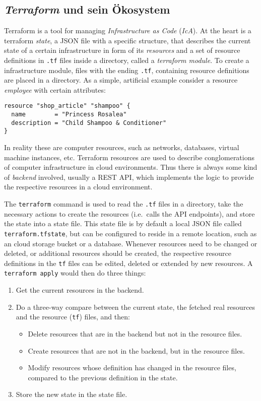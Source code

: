 \documentclass[paper=a4,11pt,numbers=noenddot]{article}
\begin{document}
\subsection{\emph{Terraform} und sein Ökosystem}
\label{subsec:terr-tool-ecosyst}

Terraform is a tool for managing \emph{Infrastructure as Code} (\emph{IcA}). At the heart is a terraform \emph{state}, a JSON file with a specific structure, that describes the current state of a certain infrastructure in form of its \emph{resources} and a set of resource definitions in \verb'.tf' files inside a directory, called a \emph{terraform module}. To create a infrastructure module, files with the ending \verb'.tf', containing resource definitions are placed in a directory. As a simple, artificial example consider a resource \emph{employee} with certain attributes:

\begin{lstlisting}
resource "shop_article" "shampoo" {
  name        = "Princess Rosalea"
  description = "Child Shampoo & Conditioner"
}
\end{lstlisting}

In reality these are computer resources, such as networks, databases, virtual machine instances, etc. Terraform resources are used to describe conglomerations of computer infrastructure in cloud environments. Thus there is always some kind of \emph{backend} involved, usually a REST API, which implements the logic to provide the respective resources in a cloud environment.

The \verb'terraform' command is used to read the \verb'.tf' files in a directory, take the necessary actions to create the resources (i.e.\ calls the API endpoints), and store the state into a state file. This state file is by default a local JSON file called \verb'terraform.tfstate', but can be configured to reside in a remote location, such as an cloud storage bucket or a database. Whenever resources need to be changed or deleted, or additional resources should be created, the respective resource definitions in the \verb'tf' files can be edited, deleted or extended by new resources. A \verb'terraform apply' would then do three things:

\begin{enumerate}
\item\label{itm:tf-read} Get the current resources in the backend.
\item\label{itm:tf-compare} Do a three-way compare between the current state, the fetched real resources and the resource (\verb'tf') files, and then:
  \begin{itemize}
  \item Delete resources that are in the backend but not in the resource files.
  \item Create resources that are not in the backend, but in the resource files.
  \item Modify resources whose definition has changed in the resource files, compared to the previous definition in the state.
  \end{itemize}
\item\label{itm:tf-create-update} Store the new state in the state file.
\end{enumerate}
\end{document}
